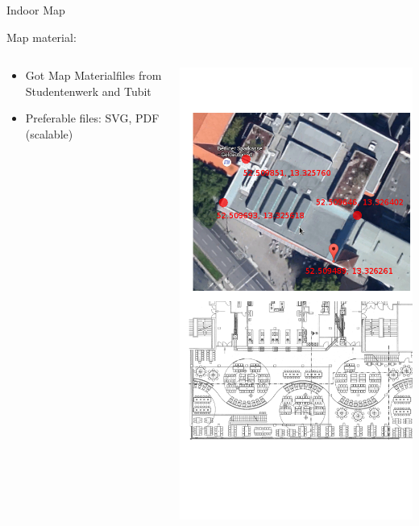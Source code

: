\documentclass[11pt]{beamer}
\begin{document}
\begin{frame}{Indoor Map}

Map material:

  \begin{columns}[T]
  \begin{column}{.6\textwidth}
  \begin{itemize}
    \item Got Map Materialfiles from Studentenwerk and Tubit
    \item Preferable files: SVG, PDF (scalable)
  \end{itemize}
  \end{column}
  \begin{column}{.4\textwidth}
  \includegraphics[scale=0.25]{mensaplan}
  \end{column}
\end{columns}

\end{frame}
\end{document}
